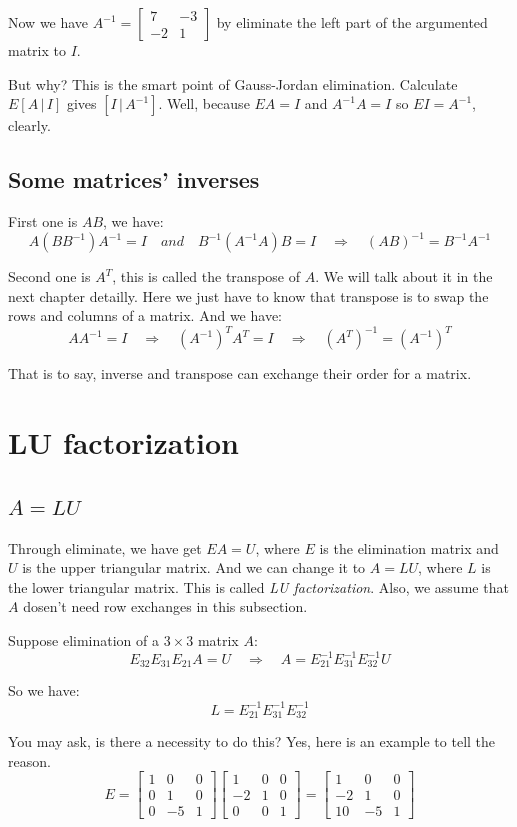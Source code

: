 \documentclass[10pt,a4paper,oneside,numbers=noenddot]{scrbook}
\theoremstyle{ctplain}
\theoremstyle{ctresult}
\begin{document}
Now we have $A^{-1} = \begin{bmatrix} 7 & -3 \\ -2 & 1 \end{bmatrix}$ by eliminate the
left part of the argumented matrix to $I$.

But why? This is the smart point of Gauss-Jordan elimination. Calculate $E [A\,|\,I]$
gives $[I\,|\,A^{-1}]$. Well, because $EA = I$ and $A^{-1}A = I$ so $EI = A^{-1}$, clearly.

\subsection{Some matrices' inverses}

First one is $AB$, we have:
\[
  A(BB^{-1})A^{-1} = I \quad and \quad B^{-1}(A^{-1}A)B = I \quad \Rightarrow
  \quad (AB)^{-1} = B^{-1}A^{-1}
\]

Second one is $A^{T}$, this is called the transpose of $A$. We will talk about it in
the next chapter detailly. Here we just have to know that transpose is to swap the rows
and columns of a matrix. And we have:
\[
  AA^{-1} = I \quad \Rightarrow \quad (A^{-1})^{T} A^{T} = I \quad \Rightarrow \quad
  (A^{T})^{-1} = (A^{-1})^{T}
\]

That is to say, inverse and transpose can exchange their order for a matrix.

\section{LU factorization}
\subsection{$A = LU$}

Through eliminate, we have get $EA = U$, where $E$ is the elimination matrix and $U$ is
the upper triangular matrix. And we can change it to $A = LU$, where $L$ is the lower
triangular matrix. This is called \emph{LU factorization}. Also, we assume that $A$
dosen't need row exchanges in this subsection.

Suppose elimination of a $3 \times 3$ matrix $A$:
\[
  E_{32}E_{31}E_{21} A = U \quad \Rightarrow \quad A = E_{21}^{-1}E_{31}^{-1}E_{32}^{-1}U
\]

So we have:
\[
  L = E_{21}^{-1}E_{31}^{-1}E_{32}^{-1}
\]

You may ask, is there a necessity to do this? Yes, here is an example to tell the reason.
\[
  E = \begin{bmatrix}
    1 & 0 & 0 \\
    0 & 1 & 0 \\
    0 & -5 & 1
  \end{bmatrix}
  \begin{bmatrix}
    1 & 0 & 0 \\
    -2 & 1 & 0 \\
    0 & 0 & 1
  \end{bmatrix}
  =
  \begin{bmatrix}
    1 & 0 & 0 \\
    -2 & 1 & 0 \\
    10 & -5 & 1
  \end{bmatrix}
\]
\end{document}
